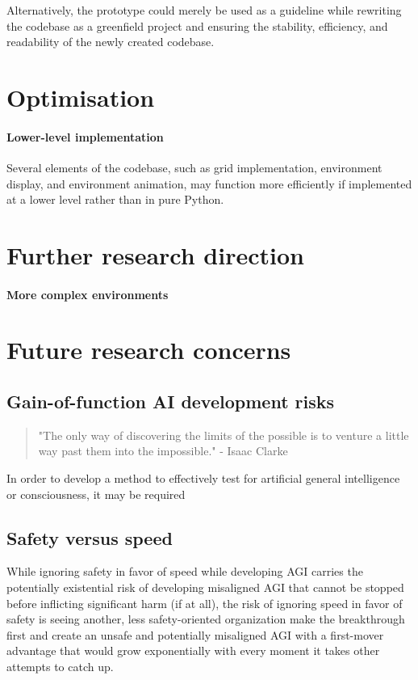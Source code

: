 \documentclass[masterthesis]{fer}
\begin{document}
Alternatively, the prototype could merely be used as a guideline while rewriting the codebase as a greenfield project and ensuring the stability, efficiency, and readability of the newly created codebase.
\section{Optimisation}
\paragraph{Lower-level implementation}
Several elements of the codebase, such as grid implementation, environment display, and environment animation,
may function more efficiently if implemented at a lower level rather than in pure Python.
\section{Further research direction}
\paragraph{More complex environments}
\section{Future research concerns}
\subsection{Gain-of-function AI development risks}
\begin{quote}
"The only way of discovering the limits of the possible is to venture a little way past them into the impossible." - Isaac Clarke
\end{quote}
In order to develop a method to effectively test for artificial general intelligence or consciousness, it may be required  
\subsection{Safety versus speed}

While ignoring safety in favor of speed while developing AGI carries the potentially existential risk of developing misaligned AGI that cannot be stopped before inflicting significant harm (if at all),
the risk of ignoring speed in favor of safety is seeing another, less safety-oriented organization make the breakthrough first and create an unsafe and potentially misaligned AGI with a first-mover advantage that would grow exponentially with every moment it takes other attempts to catch up.
\end{document}
